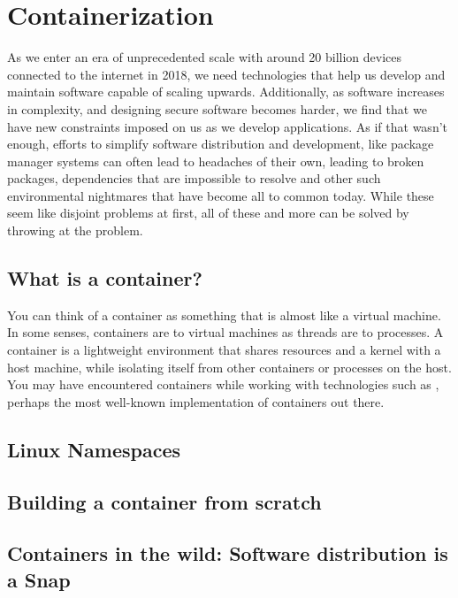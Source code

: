 \section{Containerization}
As we enter an era of unprecedented scale with around 20 billion devices
connected to the internet in 2018, we need technologies that help us develop and
maintain software capable of scaling upwards. Additionally, as software increases
in complexity, and designing secure software becomes harder, we find that we
have new constraints imposed on us as we develop applications. As if that wasn't
enough, efforts to simplify software distribution and development, like package
manager systems can often lead to headaches of their own, leading to broken
packages, dependencies that are impossible to resolve and other such
environmental nightmares that have become all to common today. While these seem
like disjoint problems at first, all of these and more can be solved by throwing
 at the problem.

\subsection{What is a container?}
You can think of a container as something that is almost like a virtual machine.
In some senses, containers are to virtual machines as threads are to processes.
A container is a lightweight environment that shares resources and a kernel with
a host machine, while isolating itself from other containers or processes on the
host. You may have encountered containers while working with technologies such
as , perhaps the most well-known implementation of containers
out there.

\subsection{Linux Namespaces}

\subsection{Building a container from scratch}

\subsection{Containers in the wild: Software distribution is a Snap}
